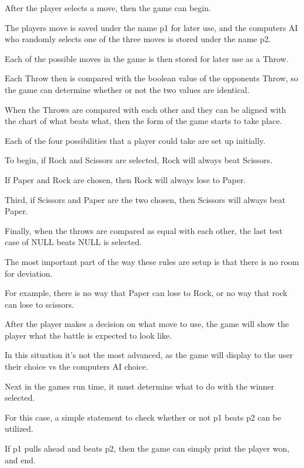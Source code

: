 \documentclass{article}
\begin{document}
\medskip\noindent
After the player selects a move, then the game can begin.

\medskip\noindent
The players move is saved under the name p1 for later use, and the computers AI who randomly selects one of the three moves is stored under the name p2.

\medskip\noindent
Each of the possible moves in the game is then stored for later use as a Throw. 

\medskip\noindent
Each Throw then is compared with the boolean value of the opponents Throw, so the game can determine whether or not the two values are identical. 

\medskip\noindent
When the Throws are compared with each other and they can be aligned with the chart of what beats what, then the form of the game starts to take place.

\medskip\noindent
Each of the four possibilities that a player could take are set up initially.

\medskip\noindent
To begin, if Rock and Scissors are selected, Rock will always beat Scissors.

\medskip\noindent
If Paper and Rock are chosen, then Rock will always lose to Paper.

\medskip\noindent
Third, if Scissors and Paper are the two chosen, then Scissors will always beat Paper.

\medskip\noindent
Finally, when the throws are compared as equal with each other, the last test case of NULL beats NULL is selected. 

\medskip\noindent
The most important part of the way these rules are setup is that there is no room for deviation.

\medskip\noindent
For example, there is no way that Paper can lose to Rock, or no way that rock can lose to scissors.

\medskip\noindent
After the player makes a decision on what move to use, the game will show the player what the battle is expected to look like.

\medskip\noindent
In this situation it's not the most advanced, as the game will display to the user their choice vs the computers AI choice.

\medskip\noindent
Next in the games run time, it must determine what to do with the winner selected.

\medskip\noindent
For this case, a simple statement to check whether or not p1 beats p2 can be utilized.

\medskip\noindent
If p1 pulls ahead and beats p2, then the game can simply print the player won, and end.
\end{document}
